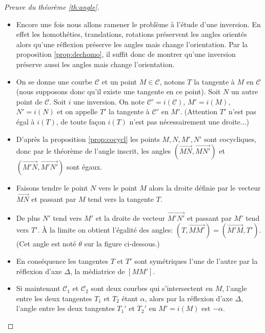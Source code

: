 \documentclass[11pt,class=report,crop=false]{standalone}
\newcommand{\inversion}{i}
\renewcommand{\vec}[1]{\overrightarrow{#1}}
\begin{document}
\begin{proof}[Preuve du théorème \ref{th:angle}]
~
\begin{itemize}
  \item Encore une fois nous allons ramener le problème à l'étude d'une inversion.
 En effet les homothéties, translations, rotations préservent les angles orientés
 alors qu'une réflexion préserve les angles mais change l'orientation. Par la 
 proposition \ref{prop:dechomo}, il suffit donc de montrer qu'une inversion préserve aussi les angles
 mais change l'orientation.
 
  \item On se donne une courbe $\mathcal{C}$ et un point $M\in \mathcal{C}$, notons
  $T$ la tangente à $M$ en $\mathcal{C}$ (nous supposons donc qu'il existe une tangente en ce point).
  Soit $N$ un autre point de $\mathcal{C}$. Soit $\inversion$ une inversion. On note
  $\mathcal{C}'= \inversion(\mathcal{C})$, $M' = \inversion(M)$, $N'=\inversion(N)$ et on appelle
  $T'$ la tangente à $\mathcal{C}'$ en $M'$. (Attention $T'$ n'est pas égal à $\inversion(T)$,
  de toute façon $\inversion(T)$ n'est pas nécessairement une droite...)

  

  
  \item D'après la proposition \ref{prop:cocycl} les points $M,N,M',N'$ sont cocycliques,
  donc par le théorème de l'angle inscrit, les angles $(\vec{MN},\vec{MN'})$ et $(\vec{M'N},\vec{M'N'})$ sont égaux.
  

  
  \item Faisons tendre le point $N$ vers le point $M$ alors la droite définie par le vecteur $\vec{MN}$
  et passant par $M$ tend vers la tangente $T$. 

  
  \item 
  De plus $N'$ tend vers $M'$ et la droite de vecteur $\vec{M'N'}$
  et passant par $M'$ tend vers $T'$. \`A la limite on obtient l'égalité des angles:
  $(T,\vec{MM'}) = (\vec{M'M},T')$. (Cet angle est noté $\theta$ sur la figure ci-dessous.)
  

  \item  En conséquence les tangentes $T$ et $T'$ sont symétriques l'une de l'autre par la réflexion d'axe $\Delta$, la médiatrice de $[MM']$.
  
  \item Si maintenant $\mathcal{C}_1$ et $\mathcal{C}_2$ sont deux courbes qui s'intersectent en $M$, l'angle entre
  les deux tangentes $T_1$ et $T_2$ étant $\alpha$, alors par la réflexion d'axe $\Delta$, l'angle entre les deux tangentes $T_1'$ et $T_2'$ en $M' = \inversion(M)$ est $-\alpha$.
\end{itemize}

\end{proof}
\end{document}
